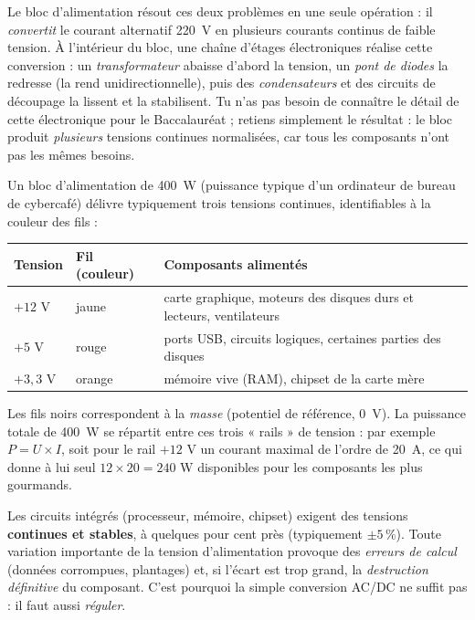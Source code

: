 \documentclass[11pt]{article}
\begin{document}
Le bloc d'alimentation résout ces deux problèmes en une seule opération : il \emph{convertit} le courant alternatif \SI{220}{V} en plusieurs courants continus de faible tension. À l'intérieur du bloc, une chaîne d'étages électroniques réalise cette conversion : un \emph{transformateur} abaisse d'abord la tension, un \emph{pont de diodes} la redresse (la rend unidirectionnelle), puis des \emph{condensateurs} et des circuits de découpage la lissent et la stabilisent. Tu n'as pas besoin de connaître le détail de cette électronique pour le Baccalauréat ; retiens simplement le résultat : le bloc produit \emph{plusieurs} tensions continues normalisées, car tous les composants n'ont pas les mêmes besoins.

\begin{exemplebox}
Un bloc d'alimentation de \SI{400}{W} (puissance typique d'un ordinateur de bureau de cybercafé) délivre typiquement trois tensions continues, identifiables à la couleur des fils :
\begin{center}
\begin{tabularx}{\linewidth}{|l|l|X|}
\hline
\rowcolor{popblueL} \textbf{Tension} & \textbf{Fil (couleur)} & \textbf{Composants alimentés} \\
\hline
$+12$ V & jaune & carte graphique, moteurs des disques durs et lecteurs, ventilateurs \\
\hline
$+5$ V & rouge & ports USB, circuits logiques, certaines parties des disques \\
\hline
$+3,3$ V & orange & mémoire vive (RAM), chipset de la carte mère \\
\hline
\end{tabularx}
\end{center}
Les fils noirs correspondent à la \emph{masse} (potentiel de référence, \SI{0}{V}). La puissance totale de \SI{400}{W} se répartit entre ces trois « rails » de tension : par exemple $P = U \times I$, soit pour le rail $+12$ V un courant maximal de l'ordre de \SI{20}{A}, ce qui donne à lui seul $12 \times 20 = 240$ W disponibles pour les composants les plus gourmands.
\end{exemplebox}

\begin{propriete}
Les circuits intégrés (processeur, mémoire, chipset) exigent des tensions \textbf{continues et stables}, à quelques pour cent près (typiquement $\pm 5\,\%$). Toute variation importante de la tension d'alimentation provoque des \emph{erreurs de calcul} (données corrompues, plantages) et, si l'écart est trop grand, la \emph{destruction définitive} du composant. C'est pourquoi la simple conversion AC/DC ne suffit pas : il faut aussi \emph{réguler}.
\end{propriete}
\end{document}
